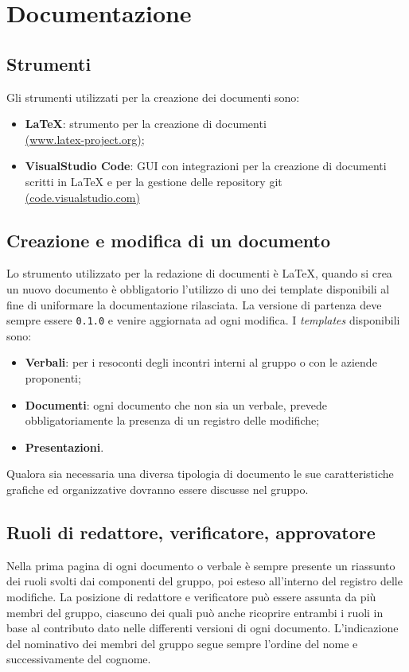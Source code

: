 \section{Documentazione}
\subsection{Strumenti}
Gli strumenti utilizzati per la creazione dei documenti sono:
\begin{itemize}
    \item \textbf{LaTeX}: strumento per la creazione di documenti \\
        \href{https://www.latex-project.org/}{(www.latex-project.org)};
    \item \textbf{VisualStudio Code}: GUI con integrazioni per la creazione di documenti scritti in LaTeX e per la gestione delle repository git \\
        \href{https://code.visualstudio.com/}{(code.visualstudio.com)}
\end{itemize}

\subsection{Creazione e modifica di un documento}
Lo strumento utilizzato per la redazione di documenti è LaTeX, quando si crea un nuovo documento è obbligatorio l'utilizzo di uno dei template disponibili al fine di uniformare la documentazione rilasciata.
La versione di partenza deve sempre essere \texttt{0.1.0} e venire aggiornata ad ogni modifica.
I \textit{templates} disponibili sono:
\begin{itemize}
    \item \textbf{Verbali}: per i resoconti degli incontri interni al gruppo o con le aziende proponenti;
    \item \textbf{Documenti}: ogni documento che non sia un verbale, prevede obbligatoriamente la presenza di un registro delle modifiche;
    \item \textbf{Presentazioni}.
\end{itemize}
Qualora sia necessaria una diversa tipologia di documento le sue caratteristiche grafiche ed organizzative dovranno essere discusse nel gruppo.

\subsection{Ruoli di redattore, verificatore, approvatore}
Nella prima pagina di ogni documento o verbale è sempre presente un riassunto dei ruoli svolti dai componenti del gruppo, poi esteso all'interno del registro delle modifiche.
La posizione di redattore e verificatore può essere assunta da più membri del gruppo, ciascuno dei quali può anche ricoprire entrambi i ruoli in base al contributo dato nelle differenti versioni di ogni documento.
L'indicazione del nominativo dei membri del gruppo segue sempre l'ordine del nome e successivamente del cognome.

